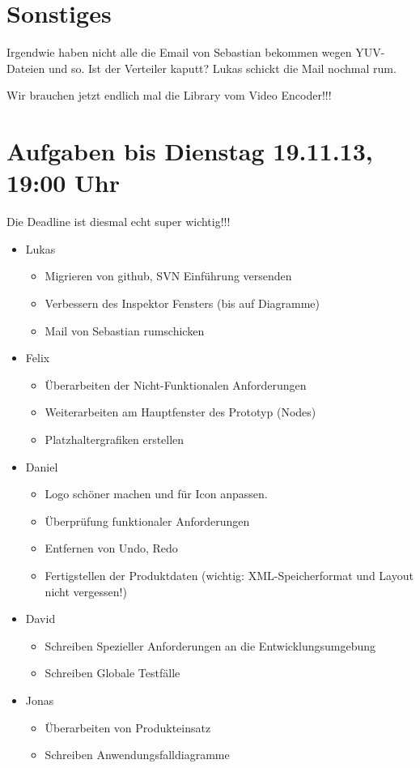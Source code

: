 \documentclass[a4paper]{article}
\begin{document}
\section{Sonstiges}

Irgendwie haben nicht alle die Email von Sebastian bekommen wegen YUV-Dateien und so. Ist der Verteiler kaputt? Lukas schickt die Mail nochmal rum.

Wir brauchen jetzt endlich mal die Library vom Video Encoder!!!

\section{Aufgaben bis Dienstag 19.11.13, 19:00 Uhr}

Die Deadline ist diesmal echt super wichtig!!!

\begin{itemize}
	\item Lukas
	\begin{itemize}
		\item Migrieren von github, SVN Einführung versenden
		\item Verbessern des Inspektor Fensters (bis auf Diagramme)
		\item Mail von Sebastian rumschicken
	\end{itemize}
	
	\item Felix
	\begin{itemize}
		\item Überarbeiten der Nicht-Funktionalen Anforderungen
		\item Weiterarbeiten am Hauptfenster des Prototyp (Nodes)
		\item Platzhaltergrafiken erstellen
	\end{itemize}
	
	\item Daniel
	\begin{itemize}
		\item Logo schöner machen und für Icon anpassen.
		\item Überprüfung funktionaler Anforderungen
		\item Entfernen von Undo, Redo
		\item Fertigstellen der Produktdaten (wichtig: XML-Speicherformat und Layout nicht vergessen!)
	\end{itemize}
	
	\item David
	\begin{itemize}
		\item Schreiben Spezieller Anforderungen an die Entwicklungsumgebung
		\item Schreiben Globale Testfälle
	\end{itemize}
	
	\item Jonas
	\begin{itemize}
		\item Überarbeiten von Produkteinsatz
		\item Schreiben Anwendungsfalldiagramme
	\end{itemize}
\end{itemize}
\end{document}
